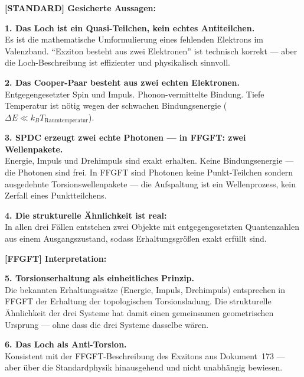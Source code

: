 \begin{conclusionBox}

\textbf{[STANDARD] Gesicherte Aussagen:}

\textbf{1. Das Loch ist ein Quasi-Teilchen, kein echtes Antiteilchen.}\\
Es ist die mathematische Umformulierung eines fehlenden Elektrons
im Valenzband. ``Exziton besteht aus zwei Elektronen'' ist
technisch korrekt --- aber die Loch-Beschreibung ist effizienter
und physikalisch sinnvoll.

\textbf{2. Das Cooper-Paar besteht aus zwei echten Elektronen.}\\
Entgegengesetzter Spin und Impuls. Phonon-vermittelte Bindung.
Tiefe Temperatur ist nötig wegen der schwachen Bindungsenergie
($\Delta E \ll k_BT_\text{Raumtemperatur}$).

\textbf{3. SPDC erzeugt zwei echte Photonen --- in FFGFT: zwei Wellenpakete.}\\
Energie, Impuls und Drehimpuls sind exakt erhalten.
Keine Bindungsenergie --- die Photonen sind frei.
In FFGFT sind Photonen keine Punkt-Teilchen sondern
ausgedehnte Torsionswellenpakete --- die Aufspaltung
ist ein Wellenprozess, kein Zerfall eines Punktteilchens.

\textbf{4. Die strukturelle Ähnlichkeit ist real:}\\
In allen drei Fällen entstehen zwei Objekte mit
entgegengesetzten Quantenzahlen aus einem Ausgangszustand,
sodass Erhaltungsgrößen exakt erfüllt sind.

\medskip

\textbf{[FFGFT] Interpretation:}

\textbf{5. Torsionserhaltung als einheitliches Prinzip.}\\
Die bekannten Erhaltungssätze (Energie, Impuls, Drehimpuls)
entsprechen in FFGFT der Erhaltung der topologischen
Torsionsladung. Die strukturelle Ähnlichkeit der drei Systeme
hat damit einen gemeinsamen geometrischen Ursprung ---
ohne dass die drei Systeme dasselbe wären.

\textbf{6. Das Loch als Anti-Torsion.}\\
Konsistent mit der FFGFT-Beschreibung des Exzitons
aus Dokument~173 --- aber über die Standardphysik hinausgehend
und nicht unabhängig bewiesen.
\end{conclusionBox}


